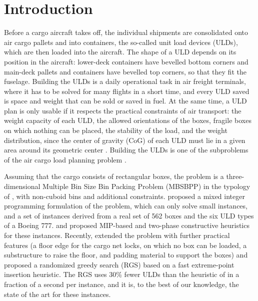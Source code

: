 \section{Introduction}
\label{sec:intro}

Before a cargo aircraft takes off, the individual shipments are consolidated onto air cargo
pallets and into containers, the so-called unit load devices (ULDs), which are then loaded into
the aircraft. The shape of a ULD depends on its position in the aircraft: lower-deck containers
have bevelled bottom corners and main-deck pallets and containers have bevelled top corners, so
that they fit the fuselage. Building the ULDs is a daily operational task in air freight
terminals, where it has to be solved for many flights in a short time, and every ULD saved is
space and weight that can be sold or saved in fuel. At the same time, a ULD plan is only usable if it respects the practical
constraints of air transport: the weight capacity of each ULD, the allowed orientations of the
boxes, fragile boxes on which nothing can be placed, the stability of the load, and the weight
distribution, since the center of gravity (CoG) of each ULD must lie in a given area around its
geometric center \citep{Paquay2016}. Building the ULDs is one of the subproblems of the air
cargo load planning problem \citep{Brandt2019}.

Assuming that the cargo consists of rectangular boxes, the problem is a three-dimensional
Multiple Bin Size Bin Packing Problem (MBSBPP) in the typology of \citet{Wascher2007}, with
non-cuboid bins and additional constraints. \citet{Paquay2016} proposed a mixed integer
programming formulation of the problem, which can only solve small instances, and a set of
instances derived from a real set of 562 boxes and the six ULD types of a Boeing 777.
\citet{Paquay2018a} and \citet{Paquay2018b} proposed MIP-based and two-phase constructive
heuristics for these instances. Recently, \citet{Hessler2025} extended the problem with
further practical features (a floor edge for the cargo net locks, on which no box can be loaded,
a substructure to raise the floor, and padding material to support the boxes) and proposed a
randomized greedy search (RGS) based on a fast extreme-point insertion heuristic. The RGS uses
30\% fewer ULDs than the heuristic of \citet{Paquay2018b} in a fraction of a second per
instance, and it is, to the best of our knowledge, the state of the art for these instances.


